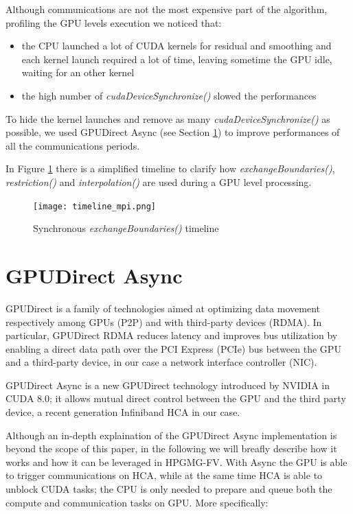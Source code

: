 \documentclass[conference]{IEEEtran}
\begin{document}
Although communications are not the most expensive part of the algorithm, profiling the GPU levels execution we noticed that:

\begin{itemize}
\item the CPU launched a lot of CUDA kernels for residual and smoothing and each kernel launch required a lot of time, leaving sometime the GPU idle, waiting for an other kernel
\item the high number of \textit{cudaDeviceSynchronize()} slowed the performances 
\end{itemize}

To hide the kernel launches and remove as many   \textit{cudaDeviceSynchronize()} as possible, we used GPUDirect Async (see Section \ref{sec:gpudirect_async}) to improve performances of all the communications periods.

In Figure \ref{fig:timeline_mpi} there is a simplified timeline to clarify how \textit{exchangeBoundaries()}, \textit{restriction()} and \textit{interpolation()} are used during a GPU level processing.

\begin{figure}[h]
\centering
\texttt{[image: timeline\_mpi.png]}
\caption{Synchronous \textit{exchangeBoundaries()} timeline}
\label{fig:timeline_mpi}
\end{figure}

\section{GPUDirect Async}\label{sec:gpudirect_async}

GPUDirect \cite{GPUDirect} is a family of technologies aimed at optimizing data movement respectively among GPUs (P2P) and with third-party devices (RDMA). In particular, GPUDirect RDMA reduces latency and improves bus utilization by enabling a direct data path over the PCI Express (PCIe) bus between the GPU and a third-party device, in our case a network interface controller (NIC).

GPUDirect Async is a new GPUDirect technology introduced by NVIDIA in CUDA 8.0; it allows mutual direct control between the GPU and the third party device, a recent generation Infiniband HCA in our case.

Although an in-depth explaination of the GPUDirect Async implementation is beyond the scope of this paper, in the following we will breafly describe how it works and how it can be leveraged in HPGMG-FV.
With Async the GPU is able to trigger communications on HCA, while at the same time HCA is able to unblock CUDA tasks; the CPU is only needed to prepare and queue both the compute and communication tasks on GPU. More specifically:
\end{document}

